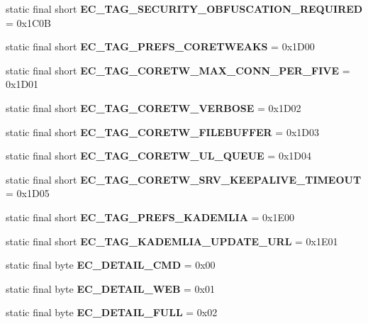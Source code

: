 \begin{DoxyCompactItemize}
\item 
static final short {\bfseries EC\_\-TAG\_\-SECURITY\_\-OBFUSCATION\_\-REQUIRED} = 0x1C0B\label{interfaceECCodes_a5819896a2da15da21f6c33e4f99f311b}

\item 
static final short {\bfseries EC\_\-TAG\_\-PREFS\_\-CORETWEAKS} = 0x1D00\label{interfaceECCodes_a03c73dff2a8413d5854c6f8d060d349d}

\item 
static final short {\bfseries EC\_\-TAG\_\-CORETW\_\-MAX\_\-CONN\_\-PER\_\-FIVE} = 0x1D01\label{interfaceECCodes_ac8c391407a509bd00aa3fba7f94a7ba1}

\item 
static final short {\bfseries EC\_\-TAG\_\-CORETW\_\-VERBOSE} = 0x1D02\label{interfaceECCodes_a4c2a178e2053eaef12c8b13c1038641a}

\item 
static final short {\bfseries EC\_\-TAG\_\-CORETW\_\-FILEBUFFER} = 0x1D03\label{interfaceECCodes_a44aae95e309bb93ad7dc76bbfa258af8}

\item 
static final short {\bfseries EC\_\-TAG\_\-CORETW\_\-UL\_\-QUEUE} = 0x1D04\label{interfaceECCodes_a1c70d6aa61ee58c958ea574e9515e897}

\item 
static final short {\bfseries EC\_\-TAG\_\-CORETW\_\-SRV\_\-KEEPALIVE\_\-TIMEOUT} = 0x1D05\label{interfaceECCodes_ab0c1068e52d4fa0ec08807d2a5f5d819}

\item 
static final short {\bfseries EC\_\-TAG\_\-PREFS\_\-KADEMLIA} = 0x1E00\label{interfaceECCodes_ad7423067900378b4416487e540772278}

\item 
static final short {\bfseries EC\_\-TAG\_\-KADEMLIA\_\-UPDATE\_\-URL} = 0x1E01\label{interfaceECCodes_aaef86cb747adfd4fad8c4d162871493e}

\item 
static final byte {\bfseries EC\_\-DETAIL\_\-CMD} = 0x00\label{interfaceECCodes_a92c2f0fa7bec3ac618f5f9884ebcd8d0}

\item 
static final byte {\bfseries EC\_\-DETAIL\_\-WEB} = 0x01\label{interfaceECCodes_a59372e6c1b2f0642dc6b82b40cb87fb6}

\item 
static final byte {\bfseries EC\_\-DETAIL\_\-FULL} = 0x02\label{interfaceECCodes_aaa206145eca0b4b4dbba1248a785781d}


\end{DoxyCompactItemize}
